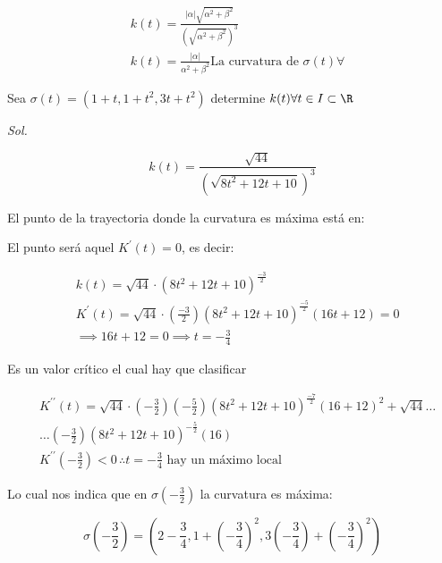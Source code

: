 \begin{align*}
	 & k(t)=\frac{\left\lvert \alpha\right\rvert\sqrt{\alpha^2+\beta^2}}{\left(\sqrt{\alpha^2+\beta^2}\right)^3} \\
	 & k(t)=\frac{\left\lvert \alpha\right\rvert}{\alpha^2+\beta^2}\text{La curvatura de } \sigma(t)\forall
\end{align*}



\begin{problem}
Sea $\sigma(t)=\left(1+t,1+t^2,3t+t^2\right)$ determine $k(t)\forall t\in I\subset \R$
\end{problem}

\textit{ Sol. }

\begin{equation*}
	k(t)=\frac{\sqrt{44}}{\left(\sqrt{8t^2+12t+10}\right)^3}
\end{equation*}

El punto de la trayectoria donde la curvatura es máxima está en:

El punto será aquel $K^{\prime} (t)=0$, es decir:

\begin{align*}
	 & k(t)=\sqrt{44}\cdot\left(8t^2+12t+10\right)^{\frac{-3}{2}}                                                         \\
	 & K^{\prime} (t)=\sqrt{44}\cdot\left(\frac{-3}{2}\right)\left(8t^2+12t+10\right)^{\frac{-5}{2}}\left(16t+12\right)=0 \\
	 & \implies 16t+12=0\implies t=-\frac{3}{4}
\end{align*}

Es un valor crítico el cual hay que clasificar

\begin{align*}
	 & K^{\prime\prime}(t)=\sqrt{44}\cdot\left(-\frac{3}{2}\right)\left(-\frac{5}{2}\right)\left(8t^2+12t+10\right)^{\frac{-7}{2}}\left(16+12\right)^2+\sqrt{44}\dots \\
	 & \dots \left(-\frac{3}{2}\right)\left(8t^2+12t+10\right)^{-\frac{5}{2}}(16)                                                                                     \\
	 & K^{\prime\prime}\left(-\frac{3}{2}\right)<0\, \therefore t=-\frac{3}{4}\text{ hay un máximo local}
\end{align*}

Lo cual nos indica que en $\sigma\left(-\frac{3}{2}\right)$ la curvatura es máxima:

\begin{equation*}
	\sigma\left(-\frac{3}{2}\right)=\left(2-\frac{3}{4},1+\left(-\frac{3}{4}\right)^2,3\left(-\frac{3}{4}\right)+\left(-\frac{3}{4}\right)^2\right)
\end{equation*}

